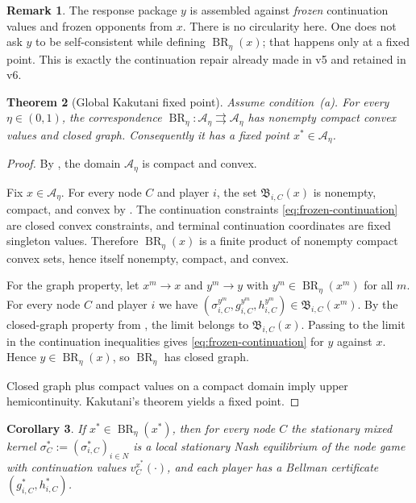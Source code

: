 \documentclass[12pt]{article}
\newtheorem{theorem}{Theorem}[section]
\newtheorem{corollary}[theorem]{Corollary}
\theoremstyle{definition}
\newtheorem{remark}[theorem]{Remark}
\newcommand{\1}{\mathbf{1}}
\newcommand{\cA}{\mathcal{A}}
\DeclareMathOperator{\BR}{BR}
\begin{document}
\begin{remark}
The response package $y$ is assembled against \emph{frozen} continuation values and
frozen opponents from $x$. There is no circularity here. One does not ask $y$ to
be self-consistent while defining $\BR_\eta(x)$; that happens only at a fixed
point. This is exactly the continuation repair already made in v5 and retained in
v6.
\end{remark}

\begin{theorem}[Global Kakutani fixed point]
\label{thm:kakutani-global}
Assume condition~\textnormal{(a)}. For every $\eta\in(0,1)$, the correspondence
$\BR_\eta:\cA_\eta\rightrightarrows\cA_\eta$ has nonempty compact convex values and
closed graph. Consequently it has a fixed point $x^*\in\cA_\eta$.
\end{theorem}

\begin{proof}
By , the domain $\cA_\eta$ is compact and convex.

Fix $x\in\cA_\eta$. For every node $C$ and player $i$, the set
$\mathfrak B_{i,C}(x)$ is nonempty, compact, and convex by
. The continuation constraints
\eqref{eq:frozen-continuation} are closed convex constraints, and terminal
continuation coordinates are fixed singleton values. Therefore $\BR_\eta(x)$ is a
finite product of nonempty compact convex sets, hence itself nonempty, compact, and
convex.

For the graph property, let $x^m\to x$ and $y^m\to y$ with
$y^m\in\BR_\eta(x^m)$ for all $m$. For every node $C$ and player $i$ we have
$(\sigma_{i,C}^{y^m},g_{i,C}^{y^m},h_{i,C}^{y^m})\in\mathfrak B_{i,C}(x^m)$. By
the closed-graph property from , the limit belongs to
$\mathfrak B_{i,C}(x)$. Passing to the limit in the continuation inequalities gives
\eqref{eq:frozen-continuation} for $y$ against $x$. Hence $y\in\BR_\eta(x)$, so
$\BR_\eta$ has closed graph.

Closed graph plus compact values on a compact domain imply upper
hemicontinuity. Kakutani's theorem \cite{Kakutani1941} yields a fixed point.
\end{proof}

\begin{corollary}
\label{cor:local-nash-at-fixed-point}
If $x^*\in\BR_\eta(x^*)$, then for every node $C$ the stationary mixed kernel
$\sigma_C^*:=(\sigma_{i,C}^*)_{i\in N}$ is a local stationary Nash equilibrium of
the node game with continuation values $v_C^{x^*}(\cdot)$, and each player has a
Bellman certificate $(g_{i,C}^*,h_{i,C}^*)$.
\end{corollary}
\end{document}
